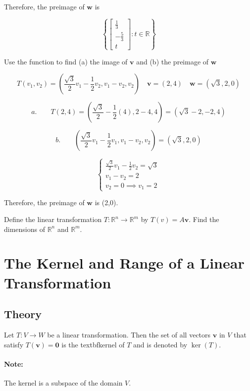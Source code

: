 \documentclass{report}
\begin{document}
\noindent Therefore, the preimage of $\bm{w}$ is 

$$
\left\{ \begin{bmatrix} \frac{1}{3} \\ -\frac{5}{3} \\ t \end{bmatrix}: t \in \mathbb{R} \right\}
$$

\begin{tcolorbox}[colframe = lightred]
	Use the function to find (a) the image of $\bm{v}$ and (b) the preimage of $\bm{w}$
	
	$$
	T(v_1, v_2) = \left( \frac{\sqrt{3}}{2} v_1 - \frac{1}{2} v_2, v_1 - v_2, v_2 \right) \quad \bm{v} = (2,4) \quad \bm{w} = (\sqrt{3}, 2, 0)
	$$
\end{tcolorbox}

$$
a. \quad \quad T(2,4) = \left( \frac{\sqrt{3}}{2} - \frac{1}{2} (4), 2-4, 4\right) = (\sqrt{3} -2, -2, 4)
$$

$$
b. \quad \quad \left( \frac{\sqrt{3}}{2} v_1 - \frac{1}{2} v_1, v_1 - v_2, v_2 \right) = (\sqrt{3}, 2, 0)
$$

$$
\begin{cases}
	\frac{\sqrt{3}}{2} v_1 - \frac{1}{2} v_2 = \sqrt{3} \\
	v_1 - v_2 = 2 \\ v_2 = 0 \implies v_1 = 2
\end{cases}
$$

Therefore, the preimage of $\bm{w}$ is (2,0).

\begin{tcolorbox}[colframe = lightred]
	Define the linear transformation $T: \mathbb{R}^n \to \mathbb{R}^m$ by $T(v) = A\bm{v}$. Find the dimensions of $\mathbb{R}^n$ and $\mathbb{R}^m$.
\end{tcolorbox}

\section{The Kernel and Range of a Linear Transformation}

\subsection{Theory}

\begin{tcolorbox}[title = Definition of Kernel of a Linear Transformation]
	Let $T: V \to W $ be a linear transformation. Then the set of all vectors $\bm{v}$ in $V$ that satisfy $T(\bm{v}) = \bm{0}$ is the textbf{kernel} of $T$ and is denoted by $\ker (T)$.
	
	\paragraph{Note:} The kernel is a subspace of the domain $V$.
\end{tcolorbox}	
\end{document}
